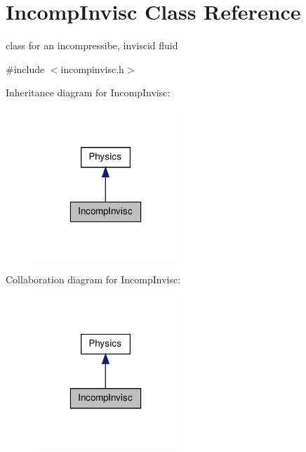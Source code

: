 \hypertarget{classIncompInvisc}{\section{\-Incomp\-Invisc \-Class \-Reference}
\label{classIncompInvisc}
}


class for an incompressibe, inviscid fluid  




{\ttfamily \#include $<$incompinvisc.\-h$>$}



\-Inheritance diagram for \-Incomp\-Invisc\-:
\nopagebreak
\begin{figure}[H]
\begin{center}
\leavevmode
\includegraphics[width=154pt]{classIncompInvisc__inherit__graph}
\end{center}
\end{figure}


\-Collaboration diagram for \-Incomp\-Invisc\-:
\nopagebreak
\begin{figure}[H]
\begin{center}
\leavevmode
\includegraphics[width=154pt]{classIncompInvisc__coll__graph}
\end{center}
\end{figure}
